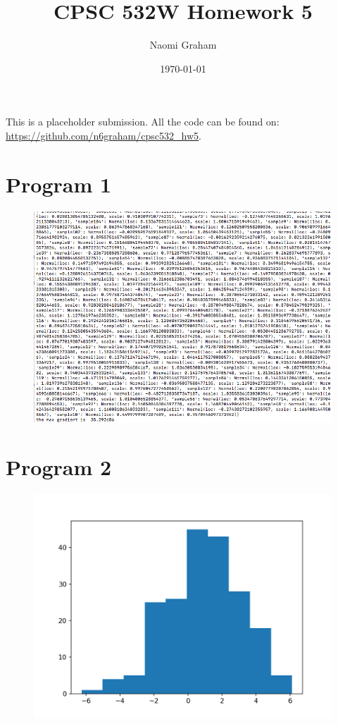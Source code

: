 \documentclass[12pt]{article}%
\theoremstyle{definition}
\begin{document}
	
	\title{CPSC 532W Homework 5}
	\author{Naomi Graham}
	\date{\today}
	\maketitle
	
	This is a placeholder submission. All the code can be found on: \url{https://github.com/n6graham/cpsc532_hw5}.
	
	


	\section{Program 1}
	
	\begin{figure}[h]
		\includegraphics[scale=0.6]{p1_screenshot}
	\end{figure}
	
	
	\newpage
	
	\section{Program 2}
	
	
	
	\begin{figure}[h]
			\includegraphics[scale=0.6]{program2_hist}
	\end{figure}
		
\end{document}
